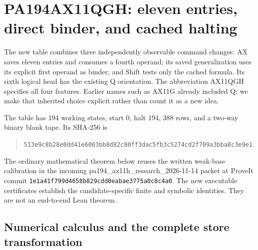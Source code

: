\section{PA194AX11QGH: eleven entries, direct binder, and cached halting}
\label{sec:ax11qgh}

The new table combines three independently observable command changes:
AX saves eleven entries and consumes a fourth operand; its saved
generalization uses its explicit first operand as binder; and Shift
tests only the cached formula.  Its sixth logical head has the existing
Q orientation.  The abbreviation \textsf{AX11QGH} specifies all four
features.  Earlier names such as \textsf{AX11G} already included Q; we
make that inherited choice explicit rather than count it as a new idea.

The table has 194 working states, start 0, halt 194, 388 rows, and a
two-way binary blank tape.  Its SHA-256 is
\begin{quote}\small\texttt{513e9c8b28e0dd41e6003bb8d82c80ff3dac5fb3c5274cd2f709a3bba8c3e9e1}.
\end{quote}
The ordinary mathematical theorem below reuses the written weak-base
calibration in the incoming \textsf{pa194\_ax11h\_research\_2026-11-14}
packet at ProveIt commit
\texttt{1e1a41f799d4658b829cdd0eabae3775a0c8c4a0}.
The new executable certificates establish the candidate-specific
finite and symbolic identities.  They are not an end-to-end Lean theorem.

\subsection{Numerical calculus and the complete store transformation}


